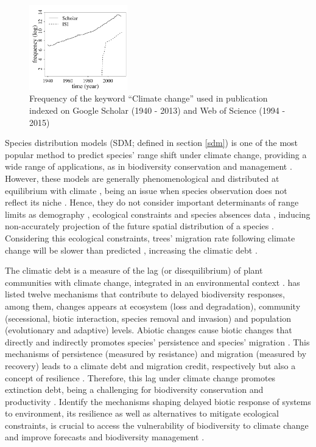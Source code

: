 \begin{figure}
    \centering
    \includegraphics[width=0.38\textwidth]{img/fig1_em.pdf}
    \caption{Frequency of the keyword ``Climate change'' used in publication indexed on Google Scholar (1940 - 2013) and Web of Science (1994 - 2015)}
    \label{fig:fig1}
\end{figure}

Species distribution models (SDM; defined in section \ref{sdm}) is one of the most popular method to predict species' range shift under climate change, providing a wide range of applications, as in biodiversity conservation and management \citep{Guisan2005,Guisan2013}.
However, these models are generally phenomenological and  distributed at equilibrium with climate \citep[e.g.][]{Pigot2013}, being an issue when species observation does not reflect its niche \citep{Schurr2012}.
Hence, they do not consider important determinants of range limits as demography \citep{Louthan2015}, ecological constraints \citep{Wisz2013,Pigot2013} and species absences data \citep{Koshkina2017}, inducing non-accurately projection of the future spatial distribution of a species \citep{Tavecchia2016}.
Considering this ecological constraints, trees' migration rate following climate change will be slower than predicted \citep{Bertrand2011,Sittaro2017}, increasing the climatic debt \citep{Bertrand2016}.

The climatic debt is a measure of the lag (or disequilibrium) of plant communities with climate change, integrated in an environmental context \citep{Bertrand2016}.
\citet{Essl2015} has listed twelve mechanisms that contribute to delayed biodiversity responses, among them, changes appears at ecosystem (loss and degradation), community (secessional, biotic interaction, species removal and invasion) and population (evolutionary and adaptive) levels.
Abiotic changes cause biotic changes that directly and indirectly promotes species' persistence and species' migration \citep{Bertrand2016}.
This mechanisms of persistence (measured by resistance) and migration (measured by recovery) leads to a climate debt and migration credit, respectively \citep{Bertrand2016} but also a concept of resilience \citep[see section \ref{res}]{Oliver2015}.
Therefore, this lag under climate change promotes extinction debt, being a challenging for biodiversity conservation \citep{Kuussaari2009} and productivity \citep{Lasch2002}.
Identify the mechanisms shaping delayed biotic response of systems to environment, its resilience as well as alternatives to mitigate ecological constraints, is crucial to access the vulnerability of biodiversity to climate change and improve forecasts and biodiversity management \citep{Essl2015,Oliver2015,Bertrand2016}.

